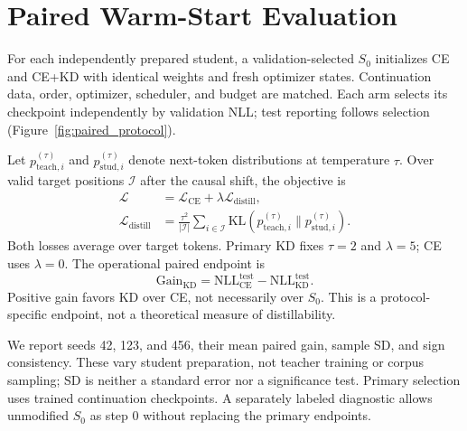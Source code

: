 \section{Paired Warm-Start Evaluation}\label{sec:problem-setting}

For each independently prepared student, a validation-selected $S_0$ initializes CE and CE+KD with identical weights and fresh optimizer states. Continuation data, order, optimizer, scheduler, and budget are matched. Each arm selects its checkpoint independently by validation NLL; test reporting follows selection (Figure~\ref{fig:paired_protocol}).

Let $p_{\mathrm{teach},i}^{(\tau)}$ and $p_{\mathrm{stud},i}^{(\tau)}$ denote next-token distributions at temperature $\tau$. Over valid target positions $\mathcal I$ after the causal shift, the objective is
\begin{align}
\mathcal L&=\mathcal L_{\mathrm{CE}}+\lambda\mathcal L_{\mathrm{distill}},\label{eq:kd-objective}\\
\mathcal L_{\mathrm{distill}}&=\frac{\tau^2}{|\mathcal I|}\sum_{i\in\mathcal I}
\mathrm{KL}\!\left(p_{\mathrm{teach},i}^{(\tau)}\|p_{\mathrm{stud},i}^{(\tau)}\right).\nonumber
\end{align}
Both losses average over target tokens. Primary KD fixes $\tau=2$ and $\lambda=5$; CE uses $\lambda=0$. The operational paired endpoint is
\begin{equation}
\mathrm{Gain}_{\mathrm{KD}}=\mathrm{NLL}_{\mathrm{CE}}^{\mathrm{test}}-\mathrm{NLL}_{\mathrm{KD}}^{\mathrm{test}}.
\label{eq:paired-gain}
\end{equation}
Positive gain favors KD over CE, not necessarily over $S_0$. This is a protocol-specific endpoint, not a theoretical measure of distillability.

We report seeds 42, 123, and 456, their mean paired gain, sample SD, and sign consistency. These vary student preparation, not teacher training or corpus sampling; SD is neither a standard error nor a significance test. Primary selection uses trained continuation checkpoints. A separately labeled diagnostic allows unmodified $S_0$ as step 0 without replacing the primary endpoints.
